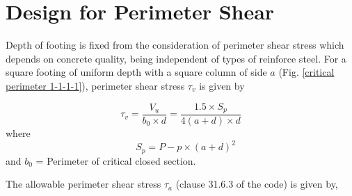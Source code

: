 \documentclass{report}
\newcommand{\figmacro}[1] {Fig. #1}
\begin{document}
\section{Design for Perimeter Shear} Depth of footing is fixed from the
consideration of perimeter shear stress which depends on concrete quality,
being independent of types of reinforce steel. For a square footing of
uniform depth with a square column of side $a$ (\figmacro \ref{critical perimeter 1-1-1-1}), perimeter shear stress
$\tau_{v}$ is given by

\begin{equation}
\label{eq:perimeterShearStress}
\tau_{v} = \frac{V_{u}} {{b_{0}} \times d} 
=\frac{1.5 \times S_{p}} {4(a + d) \times d} 
\end{equation}
where 
\begin{equation}
\label{eq:perimeterShearForce}
\quad S_{p} = P - p \times (a + d)^2
\end{equation}
and $b_0$ = Perimeter of critical closed section.

The allowable perimeter shear stress ${\tau_{a}}$ (clause 31.6.3 of
the code) is given by,

\end{document}

